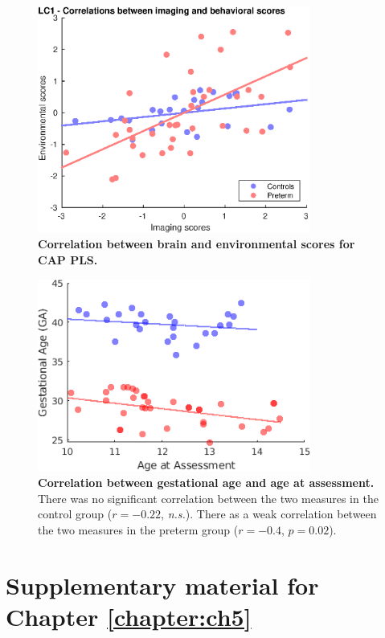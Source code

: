 \begin{figure}[h]
\centering
\includegraphics[width=0.8\textwidth]{images/Appendix/ch3_CAPs_BrainScoresxBehavScores.eps}
\caption{\textbf{Correlation between brain and environmental scores for CAP PLS.}  }
\label{fig:ch3_CAP_brainXbehavScores}
\end{figure}


\begin{figure}[h]
\centering
\includegraphics[width=0.8\textwidth]{images/Appendix/Correlation_GA_Age.png}
\caption{\textbf{Correlation between gestational age and age at assessment.} There was no significant correlation between the two measures in the control group ($r = -0.22$, \textit{n.s.}). There as a weak correlation between the two measures in the preterm group ($r = -0.4$, $p = 0.02$).  }
\label{fig:ch3_GAvsAge}
\end{figure}



\chapter{Supplementary material for Chapter \ref{chapter:ch5}} \label{appA}

